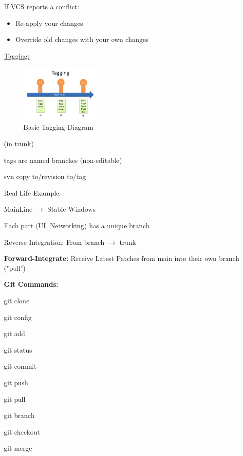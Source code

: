 \documentclass{article}
\begin{document}
\begin{flushleft}
If VCS reports a conflict: \\
\par

\begin{itemize}
    \item Re-apply your changes
    \item Override old changes with your own changes
\end{itemize} \par
\par

\underline{Tagging:} \\
\par


\begin{figure}[htp]
\centering
\includegraphics[width=4cm]{Tagging.png}
\caption{Basic Tagging Diagram}
\label{fig:BTDiagram}
\end{figure} 

(in trunk) \par
tags are named branches (non-editable) \par
svn copy to/revision to/tag \\
\par

Real Life Example: \par
MainLine $\rightarrow$ Stable Windows \par
Each part (UI, Networking) has a unique branch \par

Reverse Integration: From branch $\rightarrow$ trunk \\
\par

\textbf{Forward-Integrate:} Receive Latest Patches from main into their own branch ("pull") \\
\par

\textbf{Git Commands:} \\
\par

git clone \par
git config \par
git add \par
git status \par
git commit \par
git push \par
git pull \par
git branch \par
git checkout \par
git merge \\
\par


\end{flushleft}
\end{document}
